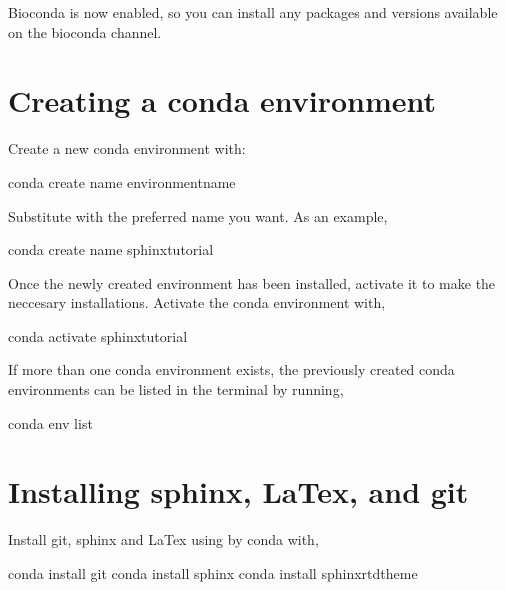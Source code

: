 \documentclass[letterpaper,10pt,english]{sphinxhowto}
\begin{document}
Bioconda is now enabled, so you can install any packages and versions available on the bioconda channel.


\section{Creating a conda environment}
\label{\detokenize{index:creating-a-conda-environment}}
Create a new conda environment with:

\begin{sphinxVerbatim}[commandchars=\\\{\}]
\PYGZdl{} conda create \PYGZhy{}\PYGZhy{}name \PYGZlt{}environment\PYGZhy{}name\PYGZgt{}
\end{sphinxVerbatim}

Substitute  with the preferred name you want. As an example,

\begin{sphinxVerbatim}[commandchars=\\\{\}]
\PYGZdl{} conda create \PYGZhy{}\PYGZhy{}name sphinx\PYGZhy{}tutorial
\end{sphinxVerbatim}

Once the newly created environment has been installed, activate it to make the neccesary installations. Activate the conda environment with,

\begin{sphinxVerbatim}[commandchars=\\\{\}]
\PYGZdl{} conda activate sphinx\PYGZhy{}tutorial
\end{sphinxVerbatim}

If more than one conda environment exists, the previously created conda environments can be listed in the terminal by running,

\begin{sphinxVerbatim}[commandchars=\\\{\}]
\PYGZdl{} conda env list
\end{sphinxVerbatim}


\section{Installing sphinx, LaTex, and git}
\label{\detokenize{index:installing-sphinx-latex-and-git}}
Install git, sphinx and LaTex using by conda with,

\begin{sphinxVerbatim}[commandchars=\\\{\}]
\PYGZdl{} conda install git
\PYGZdl{} conda install sphinx
\PYGZdl{} conda install sphinx\PYGZus{}rtd\PYGZus{}theme
\end{sphinxVerbatim}
\end{document}

